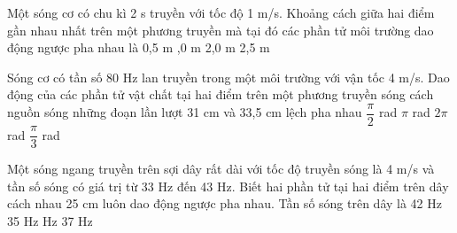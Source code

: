 \begin{vidu}%
Một sóng cơ có chu kì 2 s truyền với tốc độ 1 m/s. Khoảng cách giữa hai điểm gần nhau nhất trên một phương truyền mà tại đó các phần tử môi trường dao động ngược pha nhau là
\choice
{0,5 m}
{,0 m}
{2,0 m}
{2,5 m}
\end{vidu} 
\begin{vidu}%
Sóng cơ có tần số 80 Hz lan truyền trong một môi trường với vận tốc 4 m/s. Dao động của các phần tử vật chất tại hai điểm trên một phương truyền sóng cách nguồn sóng những đoạn lần lượt 31 cm và 33,5 cm lệch pha nhau
\choice
{$\dfrac{\pi}{2}$ rad}
{\True $\pi$ rad}
{$2\pi$ rad}
{$\dfrac{\pi}{3}$ rad}
\end{vidu} 
\begin{vidu}%
Một sóng ngang truyền trên sợi dây rất dài với tốc độ truyền sóng là 4 m/s và tần số sóng có giá trị từ 33 Hz đến 43 Hz. Biết hai phần tử tại hai điểm trên dây cách nhau 25 cm luôn dao động ngược pha nhau. Tần số sóng trên dây là
\choice
{42 Hz}
{35 Hz}
{ Hz}
{37 Hz}
\end{vidu} 


